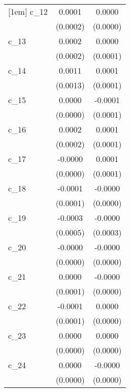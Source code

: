 {\begin{tabular}{l*{2}{c}}
[1em]
c\_12        &      0.0001        &      0.0000        \\
            &    (0.0002)        &    (0.0000)        \\
[1em]
c\_13        &      0.0002        &      0.0000        \\
            &    (0.0002)        &    (0.0001)        \\
[1em]
c\_14        &      0.0011        &      0.0001        \\
            &    (0.0013)        &    (0.0001)        \\
[1em]
c\_15        &      0.0000        &     -0.0001        \\
            &    (0.0000)        &    (0.0001)        \\
[1em]
c\_16        &      0.0002        &      0.0001        \\
            &    (0.0002)        &    (0.0001)        \\
[1em]
c\_17        &     -0.0000        &      0.0001        \\
            &    (0.0000)        &    (0.0001)        \\
[1em]
c\_18        &     -0.0001        &     -0.0000        \\
            &    (0.0001)        &    (0.0000)        \\
[1em]
c\_19        &     -0.0003        &     -0.0000        \\
            &    (0.0005)        &    (0.0003)        \\
[1em]
c\_20        &     -0.0000        &     -0.0000        \\
            &    (0.0000)        &    (0.0000)        \\
[1em]
c\_21        &      0.0000        &     -0.0000        \\
            &    (0.0001)        &    (0.0000)        \\
[1em]
c\_22        &     -0.0001        &      0.0000        \\
            &    (0.0001)        &    (0.0000)        \\
[1em]
c\_23        &      0.0000        &      0.0000        \\
            &    (0.0000)        &    (0.0000)        \\
[1em]
c\_24        &      0.0000        &     -0.0000        \\
            &    (0.0000)        &    (0.0000)        \\

\end{tabular}}
